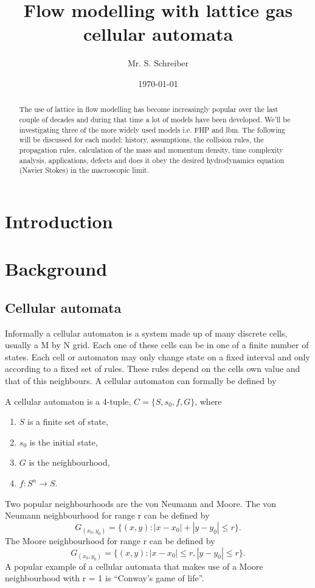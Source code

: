\documentclass[a4paper,10pt]{article}
\author{Mr. S. Schreiber}
\date{\today}
\title{Flow modelling with lattice gas cellular automata}
\newenvironment{definition}[1][Definition]{\begin{trivlist}
\item[\hskip \labelsep {\bfseries #1}]}{\end{trivlist}}
\begin{document}
\maketitle
\begin{abstract}
The use of lattice in flow modelling has become increasingly popular over the last couple of decades and during that time a lot of models have been developed. We'll be investigating three of the more widely used models i.e. FHP and \acrshort{lbm}. The following will be discussed for each model: history, assumptions, the collision rules, the propagation rules, calculation of the mass and momentum density, time complexity analysis, applications, defects and does it obey the desired hydrodynamics equation (Navier Stokes) in the macroscopic limit. 
\end{abstract}
\section{Introduction}

\section{Background}
\subsection{Cellular automata}
Informally a cellular automaton is a system made up of many discrete cells, usually a M by N grid. Each one of these cells can be in one of a finite number of states. Each cell or automaton may only change state on a fixed interval and only according to a fixed set of rules. These rules depend on the cells own value and that of this neighbours. A cellular automaton can formally be defined by
\begin{definition}
A cellular automaton is a 4-tuple, $C = \{S,s_{0},f,G\}$, where
\begin{enumerate}
\item $S$ is a finite set of state,
\item $s_{0}$ is the initial state,
\item $G$ is the neighbourhood,
\item $f:S^{n} \rightarrow S$.
\end{enumerate}
\end{definition}
Two popular neighbourhoods are the von Neumann and Moore.
The von Neumann neighbourhood for range r can be defined by \[ G_{(x_{0}, y_{0})} = \{(x, y): \left|x - x_{0} \right| + \left|y - y_{0}\right| \leq r\}.\]
The Moore neighbourhood for range r can be defined by \[ G_{(x_{0}, y_{0})} = \{(x, y): \left|x - x_{0}\right| \leq r, \left|y - y_{0}\right| \leq r \}.\]
A popular example of a cellular automata that makes use of a Moore neighbourhood with r = 1 is ``Conway's game of life''.
\end{document}
